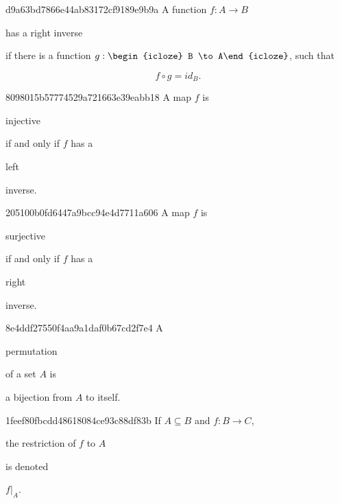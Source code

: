 \begin{note}{d9a63bd7866e44ab83172cf9189e9b9a}
    A function \({ f : A \to B }\) \begin{icloze}{3}has a right inverse\end{icloze} if there is a function \({ g : \begin{icloze}{2}B \to A\end{icloze} }\), such that
    \begin{icloze}{1}
        \[
            f \circ g = id_B.
        \]
    \end{icloze}
\end{note}

\begin{note}{8098015b57774529a721663e39eabb18}
    A map \({ f }\) is \begin{icloze}{1}injective\end{icloze} if and only if \({ f }\) has a \begin{icloze}{2}left\end{icloze} inverse.
\end{note}

\begin{note}{205100b0fd6447a9bcc94e4d7711a606}
    A map \({ f }\) is \begin{icloze}{1}surjective\end{icloze} if and only if \({ f }\) has a \begin{icloze}{2}right\end{icloze} inverse.
\end{note}

\begin{note}{8e4ddf27550f4aa9a1daf0b67cd2f7e4}
    A \begin{icloze}{2}permutation\end{icloze} of a set \({ A }\) is \begin{icloze}{1}a bijection from \({ A }\) to itself.\end{icloze}
\end{note}

\begin{note}{1feef80fbcdd48618084ce93c88df83b}
    If \({ A \subseteq B  }\) and \({ f : B \to C }\), \begin{icloze}{1}the restriction of \({ f }\) to \({ A }\)\end{icloze} is denoted \begin{icloze}{1}\({ f|_{A} }\).\end{icloze}
\end{note}

